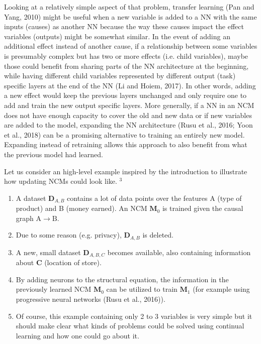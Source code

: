 \documentclass[10pt]{article}
\begin{document}
Looking at a relatively simple aspect of that problem, transfer learning (Pan and Yang, 2010) might be useful when a new variable is added to a NN with the same inputs (causes) as another NN because the way these causes impact the effect variables (outputs) might be somewhat similar. In the event of adding an additional effect instead of another cause, if a relationship between some variables is presumably complex but has two or more effects (i.e. child variables), maybe those could benefit from sharing parts of the NN architecture at the beginning, while having different child variables represented by different output (task) specific layers at the end of the NN (Li and Hoiem, 2017). In other words, adding a new effect would keep the previous layers unchanged and only require one to add and train the new output specific layers. More generally, if a NN in an NCM does not have enough capacity to cover the old and new data or if new variables are added to the model, expanding the NN architecture (Rusu et al., 2016; Yoon et al., 2018) can be a promising alternative to training an entirely new model. Expanding instead of retraining allows this approach to also benefit from what the previous model had learned.

Let us consider an high-level example inspired by the introduction to illustrate how updating NCMs could look like. ${ }^{3}$

\begin{enumerate}
  \item A dataset $\mathbf{D}_{A, B}$ contains a lot of data points over the features A (type of product) and B (money earned). An NCM $\mathbf{M}_{0}$ is trained given the causal graph $\mathrm{A} \rightarrow \mathrm{B}$.
  \item Due to some reason (e.g. privacy), $\mathbf{D}_{A, B}$ is deleted.
  \item A new, small dataset $\mathbf{D}_{A, B, C}$ becomes available, also containing information about $\mathbf{C}$ (location of store).
  \item By adding neurons to the structural equation, the information in the previously learned NCM $\mathbf{M}_{0}$ can be utilized to train $\mathbf{M}_{1}$ (for example using progressive neural networks (Rusu et al., 2016)).
  \item Of course, this example containing only 2 to 3 variables is very simple but it should make clear what kinds of problems could be solved using continual learning and how one could go about it.
\end{enumerate}
\end{document}
